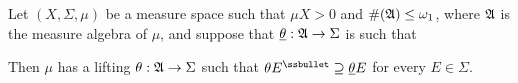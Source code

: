 Let $(X,\Sigma,\mu)$ be a measure space such that
$\mu X>0$ and $\#(\frak A)\le\omega_1$,
where $\frak A$ is the measure algebra of $\mu$, and suppose that
$\underline{\theta}:\frak A\to\Sigma$ is such that


\noindent Then $\mu$ has a lifting $\theta:\frak A\to\Sigma$ such that
$\theta E^{\ssbullet}\supseteq\undtheta E$ for every $E\in\Sigma$.

